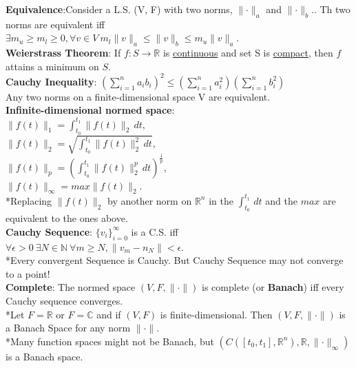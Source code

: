\documentclass[10pt,landscape]{article}
\begin{document}
\begin{multicols*}{4}
\textbf{Equivalence}:Consider a L.S. (V, F) with two norms, $\parallel \cdot \parallel_a$ and $\parallel \cdot \parallel_b$.. Th two norms are equivalent iff\\
$\exists m_u \geq m_l \geq 0, \forall v \in V\ m_l\parallel v \parallel_a \leq \parallel v \parallel_b \leq m_u\parallel v \parallel_a$.\\ 

\textbf{Weierstrass Theorem}: If $f: S \rightarrow \mathbb{R}$ is \underline{continuous} and set S is \underline{compact}, then $f$ attains a minimum on $S$.\\

\textbf{Cauchy Inequality}: $ (\sum_{i=1}^{n} a_i b_i)^{2} \leq (\sum_{i=1}^{n} a_i^2)(\sum_{i=1}^{n} b_i^2) $\\
Any two norms on a finite-dimensional space V are equivalent.\\

\textbf{Infinite-dimensional normed space}: \\
$\parallel f(t) \parallel_1 = \int_{t_0}^{t_1} \parallel f(t) \parallel_2 \,dt,$\\
$\parallel f(t) \parallel_2 = \sqrt{\int_{t_0}^{t_1} \parallel f(t) \parallel_2 ^2 \,dt},$\\
$\parallel f(t) \parallel_p = (\int_{t_0}^{t_1} \parallel f(t) \parallel_2 ^p \,dt)^{\frac{1}{p}},$\\
$\parallel f(t) \parallel_\infty = max \parallel f(t) \parallel_2.$\\
*Replacing $\parallel f(t) \parallel_2$ by another norm on $\mathbb{R}^n$ in the $\int_{t_0}^{t_1} \,dt$ and the $max$ are equivalent to the ones above.\\

\textbf{Cauchy Sequence}: $\{v_i\}_{i=0} ^\infty$ is a C.S. iff\\
$\forall \epsilon >0\ \exists N \in \mathbb{N}\ \forall m \geq N, \parallel v_m-n_N \parallel < \epsilon$.\\
*Every convergent Sequence is Cauchy. But Cauchy Sequence may not converge to a point!\\

\textbf{Complete}: The normed space $(V, F, \parallel \cdot \parallel)$ is complete (or \textbf{Banach}) iff every Cauchy sequence converges.\\
*Let $F = \mathbb{R}$ or $F = \mathbb{C}$ and if $(V,F)$ is finite-dimensional. Then $(V,F,\parallel \cdot \parallel)$ is a Banach Space for any norm $\parallel \cdot \parallel.$\\
*Many function spaces might not be Banach, but $(C([t_0,t_1], \mathbb{R}^n), \mathbb{R}, \parallel \cdot \parallel_\infty)$ is a Banach space.


\end{multicols*}
\end{document}
